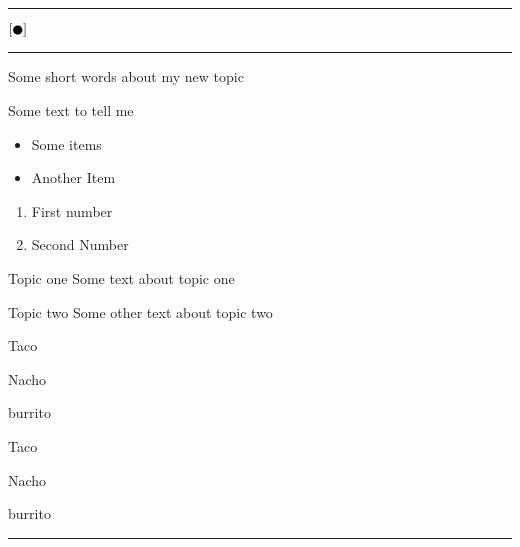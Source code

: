 \documentclass[landscape]{article}
\title{}
\author{}
\newcommand{\myline}{\vspace{4pt}\hrule  \vspace{4pt}}
\newcommand{\legalblob}{\ensuremath{ \left[ \newmoon \right] } \xspace}
\newenvironment{topic}[1]{
	\noindent \textbf{\textsc{\color{harvardcrimson}{#1}}}
	\noindent \hspace{-3.5pt}
}{
	\myline
}
\newenvironment{tellme}[1]{
	\noindent \textbf{\textit{\color{harvardblue}{#1}}}
	\begin{adjustwidth}{9pt}{}
}{
	\end{adjustwidth}
}
\newenvironment{compactitem}{
	\begin{itemize}[leftmargin=*,labelsep=5pt]
}{
	\end{itemize}
}
\newenvironment{compactenum}{
	\begin{enumerate}[leftmargin=*,labelsep=5pt]
}{
	\end{enumerate}
}
\newenvironment{compactdesc}{
	\begin{description}[leftmargin=1em,labelsep=0.7em, font=\normalfont\itshape]
}{
	\end{description}
}
\begin{document}
	\footnotesize

	\begin{multicols*}{3}

	\hfill
		\vspace{-1\baselineskip}
	\hfill
	
	\myline
		\vspace{-0.2cm}
		\begin{center}
			\LARGE \textsc{\legalblob} 
		\end{center}
		\vspace{-0.2cm}
	\myline 
	
	\begin{topic}{A New Topic} 
		Some short words about my new topic

		\begin{tellme}{This is the first tell me block}
			Some text to tell me

			\begin{compactitem}
				\item Some items
				\item Another Item
			\end{compactitem}

			\begin{compactenum}
				\item First number
				\item Second Number
			\end{compactenum}

			\begin{compactdesc}
				\item[Topic one] Some text about topic one
				\item[Topic two] Some other text about topic two
			\end{compactdesc}
      
      \begin{cproof}
        \item Taco
        \item Nacho
        \begin{cproof}
          \item burrito
        \end{cproof}
      \end{cproof}
      
      \begin{lproof}
        \item Taco
        \item Nacho
        \begin{lproof}
          \item burrito
        \end{lproof}
      \end{lproof}

		\end{tellme}
	\end{topic}

\end{multicols*}
\end{document}
